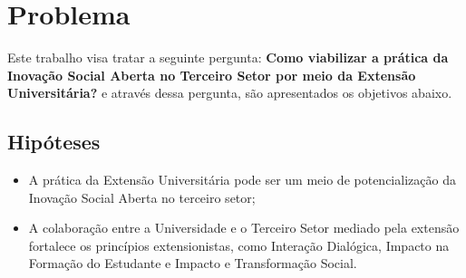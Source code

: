 \section{Problema}
\label{problema}

Este trabalho visa tratar a seguinte pergunta: \textbf{Como viabilizar a prática da Inovação Social Aberta no Terceiro Setor por meio da Extensão Universitária?} e através dessa pergunta, são apresentados os objetivos abaixo.

\subsection{Hipóteses}
\label{hipoteses}

\begin{itemize}
    \item A prática da Extensão Universitária pode ser um meio de potencialização da Inovação Social Aberta no terceiro setor;
    \item A colaboração entre a Universidade e o Terceiro Setor mediado pela extensão fortalece os princípios extensionistas, como Interação Dialógica, Impacto na Formação do Estudante e Impacto e Transformação Social.

\end{itemize}